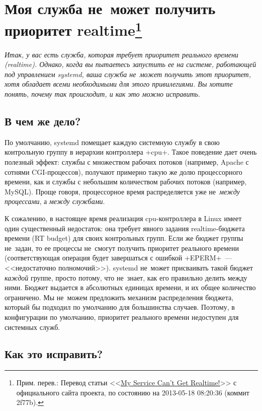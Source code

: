 \documentclass[10pt,oneside,a4paper]{article}
\newcommand{\sfnote}[1]{\texorpdfstring{\protect\footnote%
	{Прим. перев.: #1}}{}}
\newcommand\yousaywtf[1]{\emph{#1}}
\begin{document}
\section{Моя служба не~может получить приоритет realtime\sfnote{Перевод статьи
<<\href{http://www.freedesktop.org/wiki/Software/systemd/MyServiceCantGetRealtime}%
{My Service Can't Get Realtime!}>> с официального сайта проекта, по состоянию на
2013-05-18 08:20:36 (коммит 2f77b).}}
\label{sec:realtime}

\yousaywtf{Итак, у вас есть служба, которая требует приоритет реального времени
(realtime). Однако, когда вы пытаетесь запустить ее на системе, работающей под
управлением systemd, ваша служба не~может получить этот приоритет, хотя обладает
всеми необходимыми для этого привилегиями. Вы хотите понять, почему так
происходит, и как это можно исправить.}

\subsection*{В чем же дело?}

По умолчанию, systemd помещает каждую системную службу в свою контрольную группу
в иерархии контроллера +cpu+. Такое поведение дает очень полезный эффект: службы
с множеством рабочих потоков (например, Apache с сотнями CGI-процессов),
получают примерно такую же долю процессорного времени, как и службы с небольшим
количеством рабочих потоков (например, MySQL). Проще говоря, процессорное время
распределяется уже не~\emph{между процессами}, а \emph{между службами}.

К сожалению, в настоящее время реализация cpu-контроллера в Linux имеет один
существенный недостаток: она требует явного задания realtime-бюджета времени (RT
budget) для своих контрольных групп. Если же бюджет группы не~задан, то ее
процессы не~смогут получить приоритет реального времени (соответствующая
операция будет завершаться с ошибкой +EPERM+~--- <<недостаточно полномочий>>).
systemd не~может присваивать такой бюджет \emph{каждой} группе, просто потому,
что не~знает, как его правильно делить между ними. Бюджет выдается в абсолютных
единицах времени, и их общее количество ограничено. Мы не~можем предложить
механизм распределения бюджета, который бы подходил по умолчанию для большинства
случаев. Поэтому, в конфигурации по умолчанию, приоритет реального времени
недоступен для системных служб.

\subsection*{Как это исправить?}
\end{document}
